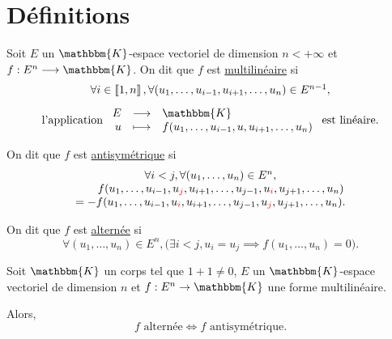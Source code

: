 \part{Définitions}

\begin{defn}
	Soit $E$ un $\mathbbm{K}$-espace vectoriel de dimension $n < +\infty$ et $f : E^n \longrightarrow \mathbbm{K}$. On dit que $f$ est \underline{multilinéaire} si
	\[
		\begin{array}{c}
			\forall i \in \left\llbracket 1,n \right\rrbracket, \forall (u_1, \ldots, u_{i-1}, u_{i+1}, \ldots, u_n) \in E^{n-1},\\[3mm]
			\text{l'application } \begin{array}{rcl}
				E &\longrightarrow& \mathbbm{K} \\
				u &\longmapsto& f(u_1, \ldots, u_{i-1}, u, u_{i+1}, \ldots, u_{n})
			\end{array} \text{ est linéaire.}
		\end{array}
	\] 

	On dit que $f$ est \underline{antisymétrique} si
	\[
		\begin{array}{c}
			\forall i < j, \forall (u_1,\ldots, u_n) \in E^n,\\
			\phantom{=-}f(u_1, \ldots, u_{i-1}, u_{\color{red} j}, u_{i+1}, \ldots, u_{j-1}, u_{\color{red}i}, u_{j+1}, \ldots, u_n)\\
			=-f(u_1, \ldots, u_{i-1}, u_{\color{red} i}, u_{i+1}, \ldots, u_{j-1}, u_{\color{red}j}, u_{j+1}, \ldots, u_n).
		\end{array}
	\] 


	On dit que $f$ est \underline{alternée} si \[
		\forall (u_1, \ldots, u_n) \in E^n, \big(\exists i < j, u_i = u_j \implies f(u_1,\ldots,u_n) = 0\big).
	\]
\end{defn}

\begin{prop}
	Soit $\mathbbm{K}$ un corps tel que $1 + 1 \neq 0$, $E$ un $\mathbbm{K}$-espace vectoriel de dimension $n$ et $f : E^{n}\to \mathbbm{K}$ une forme multilinéaire.

	Alors, \[
		f \text{ alternée} \iff f \text{ antisymétrique}.
	\]
\end{prop}

